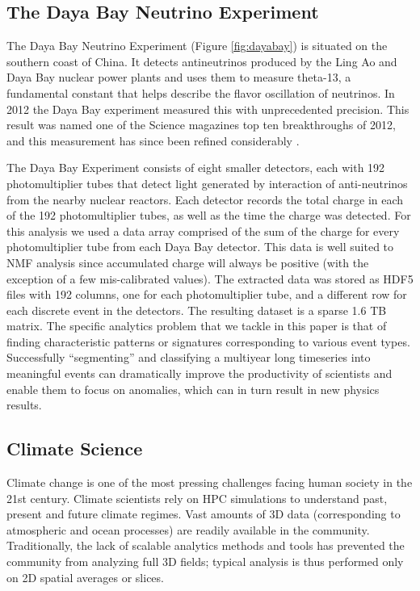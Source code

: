 \subsection{The Daya Bay Neutrino Experiment}
The Daya Bay Neutrino Experiment (Figure \ref{fig:dayabay}) is situated on the southern coast of China. It detects antineutrinos produced by the Ling Ao and Daya Bay nuclear power plants and uses them to measure theta-13, a fundamental constant that helps describe the flavor oscillation of neutrinos. In 2012 the Daya Bay experiment measured this with unprecedented precision. This result was named one of the Science magazines top ten breakthroughs of 2012, and this measurement has since been refined considerably \cite{dayabay15}.

The Daya Bay Experiment consists of eight smaller detectors, each with 192 photomultiplier tubes that detect light generated by interaction of anti-neutrinos from the nearby nuclear reactors. Each detector records the total charge in each of the 192 photomultiplier tubes, as well as the time the charge was detected. For this analysis we used a data array comprised of the sum of the charge for every photomultiplier tube from each Daya Bay detector. This data is well suited to NMF analysis since accumulated charge will always be positive (with the exception of a few mis-calibrated values). The extracted data was stored as HDF5 files with 192 columns, one for each photomultiplier tube, and a different row for each discrete event in the detectors. The resulting dataset is a sparse 1.6 TB matrix. The specific analytics problem that we tackle in this paper is that of finding characteristic patterns or signatures corresponding to various event types. Successfully ``segmenting'' and classifying a multiyear long timeseries into meaningful events can dramatically improve the productivity of scientists and enable them to focus on anomalies, which can in turn result in new physics results.

\subsection{Climate Science}

Climate change is one of the most pressing challenges facing human society in the 21st century. Climate scientists rely on HPC simulations to understand past, present and future climate regimes. Vast amounts of 3D data (corresponding to atmospheric and ocean processes) are readily available in the community. Traditionally, the lack of scalable analytics methods and tools has prevented the community from analyzing full 3D fields; typical analysis is thus performed only on 2D spatial averages or slices. 

